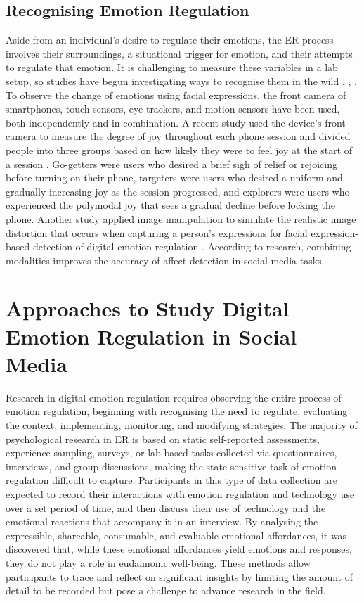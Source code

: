 \documentclass[lettersize,journal]{IEEEtran}
\begin{document}
\subsection{Recognising Emotion Regulation}
Aside from an individual's desire to regulate their emotions, the ER process involves their surroundings, a situational trigger for emotion, and their attempts to regulate that emotion. It is challenging to measure these variables in a lab setup, so studies have begun investigating ways to recognise them in the wild \cite{wadley2019use}, \cite{smith2022digital}, \cite{martin2021music}. To observe the change of emotions using facial expressions, the front camera of smartphones, touch sensors, eye trackers, and motion sensors have been used, both independently and in combination. A recent study used the device's front camera to measure the degree of joy throughout each phone session and divided people into three groups based on how likely they were to feel joy at the start of a session \cite{tag2022emotion}. Go-getters were users who desired a brief sigh of relief or rejoicing before turning on their phone, targeters were users who desired a uniform and gradually increasing joy as the session progressed, and explorers were users who experienced the polymodal joy that sees a gradual decline before locking the phone. Another study applied image manipulation to simulate the realistic image distortion that occurs when capturing a person's expressions for facial expression-based detection of digital emotion regulation \cite{yang2021benchmarking}. According to research, combining modalities improves the accuracy of affect detection in social media tasks.


\section{Approaches to Study Digital Emotion Regulation in Social Media}
Research in digital emotion regulation requires observing the entire process of emotion regulation, beginning with recognising the need to regulate, evaluating the context, implementing, monitoring, and modifying strategies. The majority of psychological research in ER is based on static self-reported assessments, experience sampling, surveys, or lab-based tasks collected via questionnaires, interviews, and group discussions, making the state-sensitive task of emotion regulation difficult to capture. Participants in this type of data collection are expected to record their interactions with emotion regulation and technology use over a set period of time, and then discuss their use of technology and the emotional reactions that accompany it in an interview.  By analysing the expressible, shareable, consumable, and evaluable emotional affordances, it was discovered that, while these emotional affordances yield emotions and responses, they do not play a role in eudaimonic well-being. These methods allow participants to trace and reflect on significant insights by limiting the amount of detail to be recorded but pose a challenge to advance research in the field.
\end{document}
